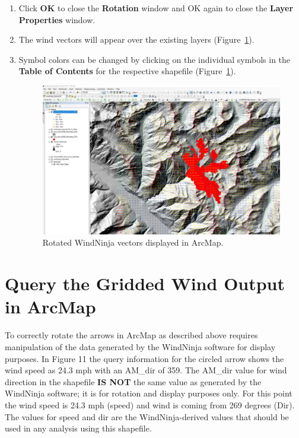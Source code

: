 \documentclass[12pt]{article}
\begin{document}
\begin{enumerate}[resume]
\item Click \textbf{OK} to close the \textbf{Rotation} window and OK again to close the \textbf{Layer Properties} window.

\item The wind vectors will appear over the existing layers (Figure~\ref{fig:Figure10}).

\item Symbol colors can be changed by clicking on the individual symbols in the \textbf{Table of
Contents} for the respective shapefile (Figure~\ref{fig:Figure10}).

\begin{figure}[H]
	\centering
	\includegraphics[scale=0.35]{arc_10.png}
	\caption{Rotated WindNinja vectors displayed in ArcMap.}
\label{fig:Figure10}
\end{figure}
\end{enumerate}

\section*{Query the Gridded Wind Output in ArcMap}
To correctly rotate the arrows in ArcMap as described above requires manipulation of the data
generated by the WindNinja software for display purposes. In Figure 11 the query information for the
circled arrow shows the wind speed as 24.3 mph with an AM\_dir of 359. The AM\_dir value for wind
direction in the shapefile \textbf{IS NOT} the same value as generated by the WindNinja software; it is for
rotation and display purposes only. For this point the wind speed is 24.3 mph (speed) and wind is
coming from 269 degrees (Dir). The values for speed and dir are the WindNinja-derived values that
should be used in any analysis using this shapefile.
\end{document}
